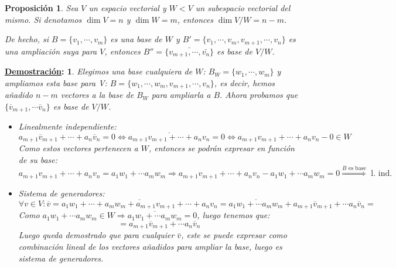 \documentclass[10pt,a4paper,openright]{book}
\theoremstyle{break}
\newtheorem*{prop}{Proposición}
\newtheorem*{demo}{\underline{Demostración}:}
\begin{document}
\begin{prop}
Sea $V$ un espacio vectorial y $W<V$ un subespacio vectorial del mismo. Si denotamos $\dim V=n$ y $\dim W=m$, entonces $\dim V/W=n-m$.

De hecho, si $B=\{v_1, \cdots , v_m\}$ es una base de $W$ y $B' = \{v_1, \cdots, v_m, v_{m+1}, \cdots, v_n\}$ es una ampliación suya para $V$, entonces $B'' = \{\bar{v_{m+1}, \cdots, \bar{v_{n}}}\}$ es base de $V/W$.
\end{prop}
\begin{demo}
Elegimos una base cualquiera de $W$: $B_W=\{w_1,\cdots,w_m\}$ y ampliamos esta base para V: $B=\{w_1,\cdots, w_m, v_{m+1}, \cdots, v_n\}$, es decir, hemos añadido $n-m$ vectores a la base de $B_W$ para ampliarla a $B$. Ahora probamos que $\{\overline{v}_{m+1},\cdots \overline{v}_n\}$ es base de $V/W$.

\begin{itemize}
\item Linealmente independiente:
$$a_{m+1}\overline{v}_{m+1}+\cdots +a_n\overline{v}_n=0\Leftrightarrow \overline{a_{m+1}v_{m+1}+\cdots +a_nv_n}=0\Leftrightarrow a_{m+1}v_{m+1}+\cdots +a_nv_n- 0\in W$$
Como estos vectores pertenecen a $W$, entonces se podrán expresar en función de su base:
$$a_{m+1}v_{m+1}+\cdots +a_nv_n=a_1w_1+\cdots a_mw_m\Rightarrow a_{m+1}v_{m+1}+\cdots +a_nv_n-a_1w_1+\cdots a_mw_m=0\stackrel{B\mbox{ es base}}{\Rightarrow}\mbox{ l. ind.}$$

\item Sistema de generadores:
$$\forall v\in V: \overline{v}=\overline{a_1w_1+\cdots+a_mw_m+a_{m+1}v_{m+1}+\cdots+ a_nv_n}=\overline{a_1w_1+\cdots a_mw_m}+a_{m+1}\overline{v}_{m+1}+\cdots a_n\overline{v}_n=$$
Como $a_1w_1+\cdots a_mw_m\in W\Rightarrow \overline{a_1w_1+\cdots a_mw_m}=0$, luego tenemos que:
$$=a_{m+1}\overline{v}_{m+1}+\cdots a_n\overline{v}_n$$
Luego queda demostrado que para cualquier $\bar{v}$, este se puede expresar como combinación lineal de los vectores añadidos para ampliar la base, luego es sistema de generadores.
\end{itemize}
\end{demo}
\end{document}
